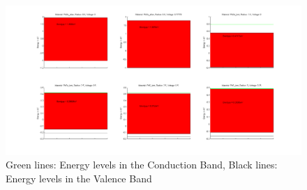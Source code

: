 \documentclass[a4paper, 11pt, landscape]{article}
\begin{document}
			\newpage
			\begin{figure}[htbp]
				\centering
				\includegraphics[width=\textwidth]{figures/BandGapsSelected.png}
				\caption{Green lines: Energy levels in the Conduction Band, Black lines: Energy levels in the Valence Band}
			\end{figure}
\end{document}
